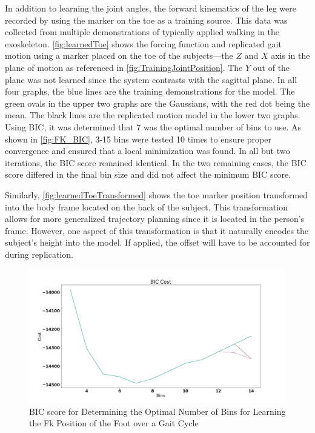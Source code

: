 In addition to learning the joint angles, the forward kinematics of the leg were recorded by using the marker on the toe as a training source. This data was collected from multiple demonstrations of typically applied walking in the exoskeleton. \autoref{fig:learnedToe} shows the forcing function and replicated gait motion using a marker placed on the toe of the subjects—the $Z$ and $X$ axis in the plane of motion as referenced in \autoref{fig:TrainingJointPosition}. The $Y$ out of the plane was not learned since the system contrasts with the sagittal plane. In all four graphs, the blue lines are the training demonstrations for the model. The green ovals in the upper two graphs are the Gaussians, with the red dot being the mean. The black lines are the replicated motion model in the lower two graphs. Using BIC, it was determined that 7 was the optimal number of bins to use. As shown in \autoref{fig:FK_BIC}, 3-15 bins were tested 10 times to ensure proper convergence and ensured that a local minimization was found. In all but two iterations, the BIC score remained identical. In the two remaining cases, the BIC score differed in the final bin size and did not affect the minimum BIC score.


Similarly, \autoref{fig:learnedToeTransformed} shows the toe marker position transformed into the body frame located on the back of the subject. This transformation allows for more generalized trajectory planning since it is located in the person's frame. However, one aspect of this transformation is that it naturally encodes the subject's height into the model. If applied, the offset will have to be accounted for during replication.

\begin{figure}
    \centering
    \includegraphics[scale=0.25]{images/gait_data/BIC_FK.png}
    \caption[FK BIC Score]{BIC score for Determining the Optimal Number of Bins for Learning the Fk Position of the Foot over a Gait Cycle}
    \label{fig:FK_BIC}
\end{figure}



